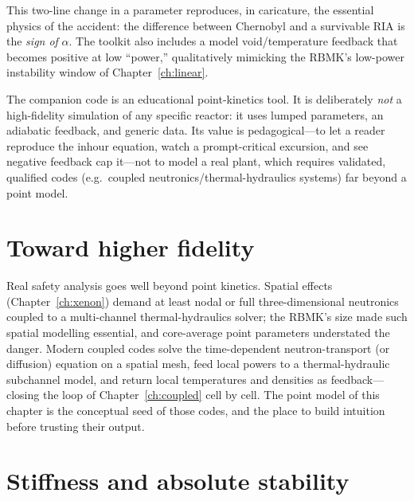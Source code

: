 This two-line change in a parameter reproduces, in caricature, the essential
physics of the accident: the difference between Chernobyl and a survivable RIA is
the \emph{sign of} $\alpha$. The toolkit also includes a model void/temperature
feedback that becomes positive at low ``power,'' qualitatively mimicking the RBMK's
low-power instability window of Chapter~\ref{ch:linear}.

\begin{remark}
The companion code is an educational point-kinetics tool. It is deliberately
\emph{not} a high-fidelity simulation of any specific reactor: it uses lumped
parameters, an adiabatic feedback, and generic data. Its value is pedagogical---to
let a reader reproduce the inhour equation, watch a prompt-critical excursion, and
see negative feedback cap it---not to model a real plant, which requires validated,
qualified codes (e.g.\ coupled neutronics/thermal-hydraulics systems) far beyond a
point model.
\end{remark}

\section{Toward higher fidelity}

Real safety analysis goes well beyond point kinetics. Spatial effects
(Chapter~\ref{ch:xenon}) demand at least nodal or full three-dimensional
neutronics coupled to a multi-channel thermal-hydraulics solver; the RBMK's size
made such spatial modelling essential, and core-average point parameters
understated the danger. Modern coupled codes solve the time-dependent
neutron-transport (or diffusion) equation on a spatial mesh, feed local powers to a
thermal-hydraulic subchannel model, and return local temperatures and densities as
feedback---closing the loop of Chapter~\ref{ch:coupled} cell by cell. The point
model of this chapter is the conceptual seed of those codes, and the place to build
intuition before trusting their output.




\section{Stiffness and absolute stability}
\label{sec:stiffness}

